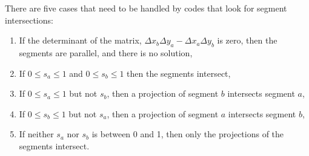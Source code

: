 There are five cases that need to be handled by codes that look for segment intersections:
\begin{enumerate}
\item If the determinant of the matrix, $\Delta x_b \Delta y_a - \Delta x_a \Delta y_b$ is zero, then the segments are parallel, and there is no solution,
\item If $0 \le s_a \le 1$ and $0 \le s_b \le 1$ then the segments intersect,
\item If $0 \le s_a \le 1$ but not $s_b$, then a projection of segment $b$ intersects segment $a$,
\item If $0 \le s_b \le 1$ but not $s_a$, then a projection of segment $a$ intersects segment $b$,
\item If neither $s_a$ nor $s_b$ is between 0 and 1, then only the projections of the segments intersect.
\end{enumerate}
